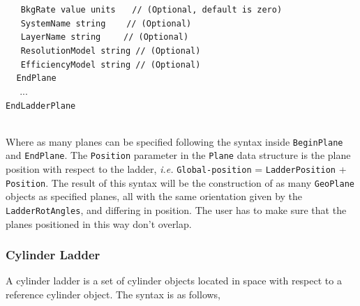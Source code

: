 $~~~~~~~${\tt BkgRate          value units                       $~~~$   // (Optional, default is zero)} \\
$~~~~~~~${\tt SystemName       string                          $~~~~~$   // (Optional)} \\
$~~~~~~~${\tt LayerName        string                         $~~~~~~$   // (Optional)} \\
$~~~~~~~${\tt ResolutionModel  string                                    // (Optional)} \\
$~~~~~~~${\tt EfficiencyModel  string                                    // (Optional)} \\
$~~~~~${\tt EndPlane} \\
$~~~~~$ ... \\
{\tt EndLadderPlane}

~\\
\noindent
Where as many planes can be specified following the syntax inside {\tt BeginPlane} and {\tt EndPlane}. The {\tt Position} 
parameter in the {\tt Plane} data structure is the plane position with respect to the ladder, {\it i.e.} {\tt Global-position} = 
{\tt LadderPosition} + {\tt Position}. The result of this syntax will be the construction of as many {\tt GeoPlane} objects as 
specified planes, all with the same orientation given by the {\tt LadderRotAngles}, and differing in position. The user has to 
make sure that the planes positioned in this way don't overlap.

\subsubsection{Cylinder Ladder}

A cylinder ladder is a set of cylinder objects located in space with respect to a reference cylinder object.
The syntax is as follows,

